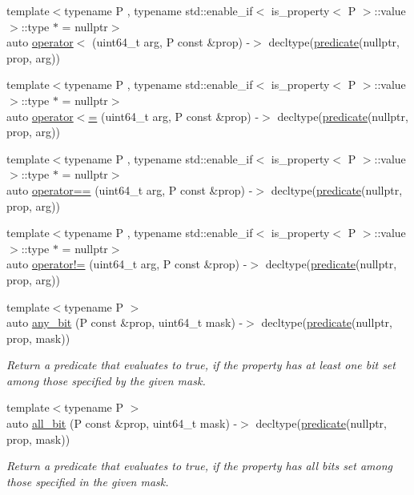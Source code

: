 \begin{DoxyCompactItemize}
\item 
{\footnotesize template$<$typename P , typename std\+::enable\+\_\+if$<$ is\+\_\+property$<$ P $>$\+::value $>$\+::type $\ast$  = nullptr$>$ }\\auto \hyperlink{namespacepfq_1_1lang_aff17190c67c14754515551bc27f056da}{operator$<$} (uint64\+\_\+t arg, P const \&prop) -\/$>$ decltype(\hyperlink{namespacepfq_1_1lang_aca9adafc436b7f851621b979fa1aaf88}{predicate}(nullptr, prop, arg))
\item 
{\footnotesize template$<$typename P , typename std\+::enable\+\_\+if$<$ is\+\_\+property$<$ P $>$\+::value $>$\+::type $\ast$  = nullptr$>$ }\\auto \hyperlink{namespacepfq_1_1lang_ab78da35da3a46ac1e889653ace01c7a8}{operator$<$=} (uint64\+\_\+t arg, P const \&prop) -\/$>$ decltype(\hyperlink{namespacepfq_1_1lang_aca9adafc436b7f851621b979fa1aaf88}{predicate}(nullptr, prop, arg))
\item 
{\footnotesize template$<$typename P , typename std\+::enable\+\_\+if$<$ is\+\_\+property$<$ P $>$\+::value $>$\+::type $\ast$  = nullptr$>$ }\\auto \hyperlink{namespacepfq_1_1lang_a3228fe8e103aaca7682f0256ea6b254c}{operator==} (uint64\+\_\+t arg, P const \&prop) -\/$>$ decltype(\hyperlink{namespacepfq_1_1lang_aca9adafc436b7f851621b979fa1aaf88}{predicate}(nullptr, prop, arg))
\item 
{\footnotesize template$<$typename P , typename std\+::enable\+\_\+if$<$ is\+\_\+property$<$ P $>$\+::value $>$\+::type $\ast$  = nullptr$>$ }\\auto \hyperlink{namespacepfq_1_1lang_a55e12516137152fe0525bfc203b5fe50}{operator!=} (uint64\+\_\+t arg, P const \&prop) -\/$>$ decltype(\hyperlink{namespacepfq_1_1lang_aca9adafc436b7f851621b979fa1aaf88}{predicate}(nullptr, prop, arg))
\item 
{\footnotesize template$<$typename P $>$ }\\auto \hyperlink{namespacepfq_1_1lang_ac247c3827084d381d8518dabfff43bb2}{any\+\_\+bit} (P const \&prop, uint64\+\_\+t mask) -\/$>$ decltype(\hyperlink{namespacepfq_1_1lang_aca9adafc436b7f851621b979fa1aaf88}{predicate}(nullptr, prop, mask))
\begin{DoxyCompactList}\small\item\em Return a predicate that evaluates to {\ttfamily true}, if the property has at least one bit set among those specified by the given mask. \end{DoxyCompactList}\item 
{\footnotesize template$<$typename P $>$ }\\auto \hyperlink{namespacepfq_1_1lang_a62b1989f7b5d84549a99b1df46743bd6}{all\+\_\+bit} (P const \&prop, uint64\+\_\+t mask) -\/$>$ decltype(\hyperlink{namespacepfq_1_1lang_aca9adafc436b7f851621b979fa1aaf88}{predicate}(nullptr, prop, mask))
\begin{DoxyCompactList}\small\item\em Return a predicate that evaluates to {\ttfamily true}, if the property has all bits set among those specified in the given mask. \end{DoxyCompactList}\end{DoxyCompactItemize}
